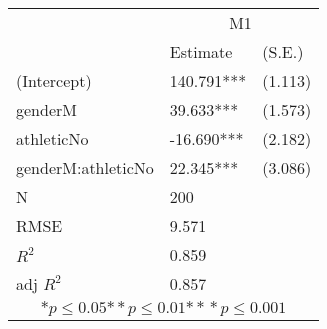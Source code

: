 \begin{tabular}{*{3}{l}}
\hline
                  & \multicolumn{2}{c}{M1}   \tabularnewline
                   &Estimate  &(S.E.)  \tabularnewline
 \hline
 \hline
   (Intercept)     &140.791***   &   (1.113) \tabularnewline
   genderM         &39.633***   &   (1.573) \tabularnewline
   athleticNo      &-16.690***   &   (2.182) \tabularnewline
   genderM:athleticNo    &22.345***   &   (3.086) \tabularnewline
 \hline
 N                 &200       &        \tabularnewline
 RMSE             &9.571         & \tabularnewline
 $R^2$             &0.859         & \tabularnewline
 adj $R^2$         &0.857         & \tabularnewline
 \hline
\hline
 
 \multicolumn{3}{c}{${*  p}\le 0.05$${*\!\!*  p}\le 0.01$${*\!\!*\!\!*  p}\le 0.001$}\tabularnewline
 \end{tabular}